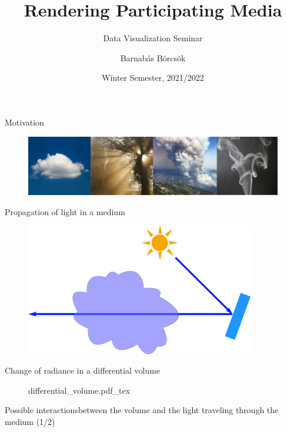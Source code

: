 \documentclass[
  english,            %
  aspectratio=169,    %
]{tumbeamer}
\title{Rendering Participating Media}
\subtitle{Data Visualization Seminar}
\author{Barnabás Börcsök}
\institute{\theChairName\\\theDepartmentName\\\theUniversityName}
\date[WS 2021/2022]{Winter Semester, 2021/2022}
\newcommand{\incfig}[1]{%
    \def\svgwidth{\columnwidth}
    {#1.pdf_tex}
}
\begin{document}
\maketitle

\begin{frame}{Motivation}
  \begin{figure}
      \centering
      \includegraphics{img/teaser.png}
      \label{fig:teaser}
  \end{figure}
\end{frame}

\begin{frame}{Propagation of light in a medium}
    \begin{figure}[ht]
        \centering
        \def\svgwidth{\columnwidth}
        \includegraphics[width=10cm]{img/propagation-illustration.png}
    \end{figure}
\end{frame}

\begin{frame}{Change of radiance in a differential volume}
    \begin{figure}[ht]
        \centering
        \incfig{differential_volume}
        \label{fig:vre}
    \end{figure}
\end{frame}

\begin{frame}{Possible interactions}{between the volume and the light
    traveling through the medium (1/2)}
\begin{figure}[ht]
    \centering
    
    \label{fig:interactions}
\end{figure}
\end{frame}
\end{document}
